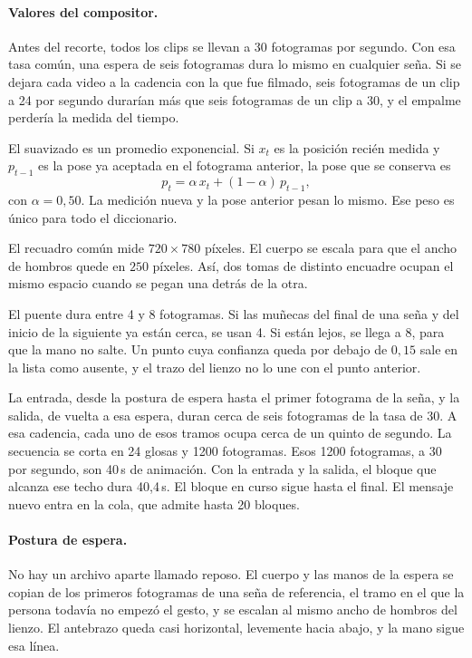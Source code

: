 \paragraph{Valores del compositor.}
Antes del recorte, todos los clips se llevan a 30 fotogramas por segundo. Con esa tasa común, una espera de seis fotogramas dura lo mismo en cualquier seña. Si se dejara cada video a la cadencia con la que fue filmado, seis fotogramas de un clip a 24 por segundo durarían más que seis fotogramas de un clip a 30, y el empalme perdería la medida del tiempo.

El suavizado es un promedio exponencial. Si $x_t$ es la posición recién medida y $p_{t-1}$ es la pose ya aceptada en el fotograma anterior, la pose que se conserva es
\begin{equation}
p_t = \alpha\, x_t + (1 - \alpha)\, p_{t-1},
\label{eq:ema_pose}
\end{equation}
con $\alpha = 0{,}50$. La medición nueva y la pose anterior pesan lo mismo. Ese peso es único para todo el diccionario.

El recuadro común mide $720 \times 780$ píxeles. El cuerpo se escala para que el ancho de hombros quede en $250$ píxeles. Así, dos tomas de distinto encuadre ocupan el mismo espacio cuando se pegan una detrás de la otra.

El puente dura entre 4 y 8 fotogramas. Si las muñecas del final de una seña y del inicio de la siguiente ya están cerca, se usan 4. Si están lejos, se llega a 8, para que la mano no salte. Un punto cuya confianza queda por debajo de $0{,}15$ sale en la lista como ausente, y el trazo del lienzo no lo une con el punto anterior.

La entrada, desde la postura de espera hasta el primer fotograma de la seña, y la salida, de vuelta a esa espera, duran cerca de seis fotogramas de la tasa de 30. A esa cadencia, cada uno de esos tramos ocupa cerca de un quinto de segundo. La secuencia se corta en 24 glosas y 1200 fotogramas. Esos 1200 fotogramas, a 30 por segundo, son 40\,s de animación. Con la entrada y la salida, el bloque que alcanza ese techo dura 40,4\,s. El bloque en curso sigue hasta el final. El mensaje nuevo entra en la cola, que admite hasta 20 bloques.

\paragraph{Postura de espera.}
No hay un archivo aparte llamado reposo. El cuerpo y las manos de la espera se copian de los primeros fotogramas de una seña de referencia, el tramo en el que la persona todavía no empezó el gesto, y se escalan al mismo ancho de hombros del lienzo. El antebrazo queda casi horizontal, levemente hacia abajo, y la mano sigue esa línea.

